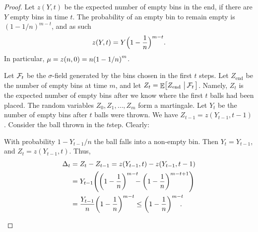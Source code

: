 \begin{proof}
    Let $z(Y,t)$ be the expected number of empty bins in the end, if
    there are $Y$ empty bins in time $t$. The probability of an empty
    bin to remain empty is $(1-1/n)^{m-t}$, and as such
    \begin{align*}
      z(Y,t) = Y  \Bigl( 1-\frac{1}{n} \Bigr)^{m-t}.
    \end{align*}
    In particular, $\mu = z(n, 0) = n \pth[]{1-\nfrac{1}{n}}^m$.

    \smallskip

    Let $\mathcal{F}_t$ be the $\sigma$-field generated by the bins chosen
    in the first $t$ steps. Let $Z_{\textrm{end}}$ be the number of
    empty bins at time $m$, and let $Z_t = \mathop{\mathbb{E}}\!\left[ {Z_{\textrm{end}}
       \,\left|\, {\mathcal{F}_t} \bigr.\right.} \right]$. Namely, $Z_t$ is the expected number of
    empty bins after we know where the first $t$ balls had been
    placed.  The random variables $Z_0, Z_1, \ldots, Z_m$ form a
    martingale.  Let $Y_t$ be the number of empty bins after $t$ balls
    were thrown. We have $Z_{t-1} = z(Y_{t-1},t-1)$.  Consider the
    ball thrown in the $t$\th step. Clearly:
    \smallskip%
    \begin{compactenumA}
        \item With probability $1 - Y_{t-1}/n$ the ball falls
        into a non-empty bin. Then $Y_t= Y_{t-1}$, and $Z_t
        = z(Y_{t-1},t)$. Thus,
        \begin{align*}
          \Delta_t%
          &=%
            Z_t - Z_{t-1} = z(Y_{t-1},t) - z(Y_{t-1},t-1)%
            \\&
            =%
            Y_{t-1} \pth[]{ \pth{1-\frac{1}{n}}^{m-t}\!\!\!\! -
            \pth[]{1-\frac{1}{n}}^{m-t+1}}%
          \\&%
          =%
          \frac{Y_{t-1}}{n}\pth{1-\frac{1}{n}}^{m-t}%
          \leq%
          \pth{1-\frac{1}{n}}^{m-t} \!\!\!.
        \end{align*}


\end{compactenumA}
\end{proof}
